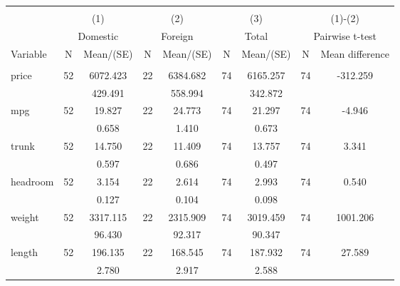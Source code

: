 
\begin{tabular}{@{\extracolsep{5pt}}lcccccccc}
\\[-1.8ex]\hline \hline \\[-1.8ex]
 & \multicolumn{2}{c}{(1)}  & \multicolumn{2}{c}{(2)}  & \multicolumn{2}{c}{(3)}  & \multicolumn{2}{c}{(1)-(2)} \\
 & \multicolumn{2}{c}{Domestic}  & \multicolumn{2}{c}{Foreign}  & \multicolumn{2}{c}{Total}  & \multicolumn{2}{c}{Pairwise t-test}  \\
Variable & N & Mean/(SE) & N & Mean/(SE) & N & Mean/(SE) & N & Mean difference \\ \hline \\[-1.8ex] 
price   & 52    &  6072.423    & 22    &  6384.682    & 74    &  6165.257    & 74    &  -312.259   \\
 &   &   429.491  &   &   558.994  &   &   342.872  &   &   \\
mpg   & 52    &    19.827    & 22    &    24.773    & 74    &    21.297    & 74    &    -4.946   \\
 &   &     0.658  &   &     1.410  &   &     0.673  &   &   \\
trunk   & 52    &    14.750    & 22    &    11.409    & 74    &    13.757    & 74    &     3.341   \\
 &   &     0.597  &   &     0.686  &   &     0.497  &   &   \\
headroom   & 52    &     3.154    & 22    &     2.614    & 74    &     2.993    & 74    &     0.540   \\
 &   &     0.127  &   &     0.104  &   &     0.098  &   &   \\
weight   & 52    &  3317.115    & 22    &  2315.909    & 74    &  3019.459    & 74    &  1001.206   \\
 &   &    96.430  &   &    92.317  &   &    90.347  &   &   \\
length   & 52    &   196.135    & 22    &   168.545    & 74    &   187.932    & 74    &    27.589   \\
 &   &     2.780  &   &     2.917  &   &     2.588  &   &   \\

\end{tabular}
